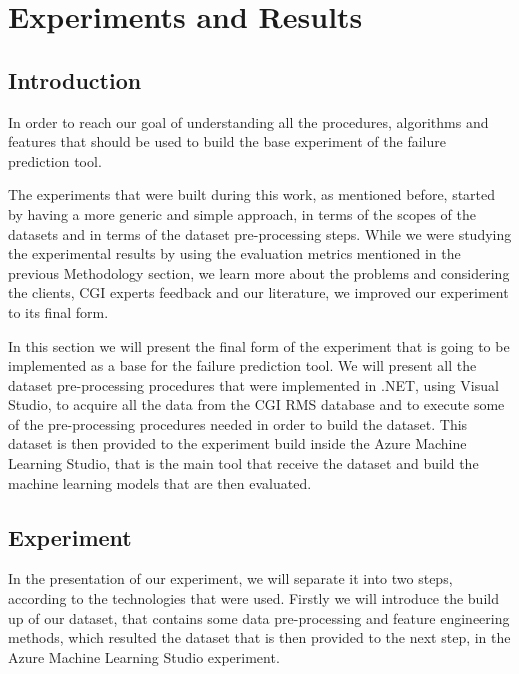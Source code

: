 


\chapter{Experiments and Results}
\label{cha:Experiments and Results}


\section{Introduction}
\label{sub:if_you_use_this_template} 
In order to reach our goal of understanding all the procedures, algorithms and features that should be used to build the base experiment of the failure prediction tool.

The experiments that were built during this work, as mentioned before, started by having a more generic and simple approach, in terms of the scopes of the datasets and in terms of the dataset pre-processing steps. While we were studying the experimental results by using the evaluation metrics mentioned in the previous Methodology section, we learn more about the problems and considering the clients, CGI experts feedback and our literature, we improved our experiment to its final form.

In this section we will present the final form of the experiment that is going to be implemented as a base for the failure prediction tool. We will present all the dataset pre-processing procedures that were implemented in .NET, using Visual Studio, to acquire all the data from the CGI RMS database and to execute some of the pre-processing procedures needed in order to build the dataset. This dataset is then provided to the experiment build inside the Azure Machine Learning Studio, that is the main tool that receive the dataset and build the machine learning models that are then evaluated.

\section{Experiment}
In the presentation of our experiment, we will separate it into two steps, according to the technologies that were used. Firstly we will introduce the build up of our dataset, that contains some data pre-processing and feature engineering methods, which resulted the dataset that is then provided to the next step, in the Azure Machine Learning Studio experiment.

